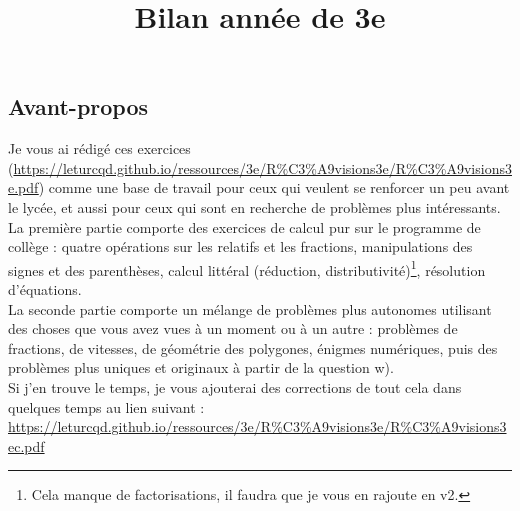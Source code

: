 \documentclass[14pt]{extreport}
\title{Bilan année de 3e}
\date{}
\newcounter{n}
\theoremstyle{plain}
\begin{document}
\subsection*{Avant-propos}
Je vous ai rédigé ces exercices (\url{https://leturcqd.github.io/ressources/3e/R\%C3\%A9visions3e/R\%C3\%A9visions3e.pdf}) comme une base de travail pour ceux qui veulent se renforcer un peu avant le lycée, et aussi pour ceux qui sont en recherche de problèmes plus intéressants. \\La première partie comporte des exercices de calcul pur sur le programme de collège : quatre opérations sur les relatifs et les fractions, manipulations des signes et des parenthèses, calcul littéral (réduction, distributivité)\footnote{Cela manque de factorisations, il faudra que je vous en rajoute en v2.}, résolution d'équations.
\\ La seconde partie comporte un mélange de problèmes plus autonomes utilisant des choses que vous avez vues à un moment ou à un autre : problèmes de fractions, de vitesses, de géométrie des polygones, énigmes numériques, puis des problèmes plus uniques et originaux à partir de la question w). \\
Si j'en trouve le temps, je vous ajouterai des corrections de tout cela dans quelques temps au lien suivant : \url{https://leturcqd.github.io/ressources/3e/R\%C3\%A9visions3e/R\%C3\%A9visions3ec.pdf}
\end{document}
